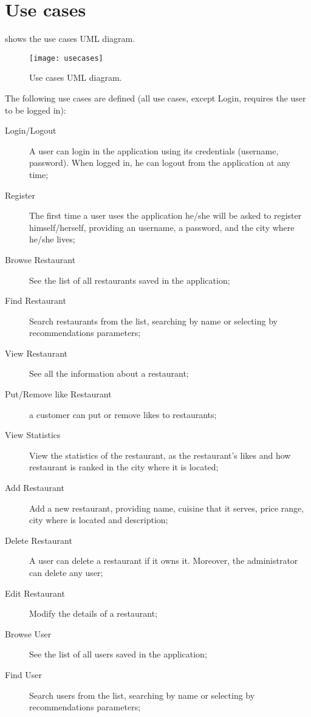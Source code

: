 \chapter{Use cases}\label{ch:usecases}

 shows the use cases UML diagram.

\begin{figure}[p]
	\texttt{[image: usecases]}
	\caption{Use cases UML diagram.}\label{fig:usecases}
\end{figure}

The following use cases are defined (all use cases, except Login, requires
the user to be logged in):
\begin{description}
	\item[Login/Logout] A user can login in the application using its
		credentials (username, password). When logged in, he can logout
		from the application at any time;
	\item[Register] The first time a user uses the application he/she will
		be asked to register himself/herself, providing an username, a
		password, and the city where he/she lives;
	\item[Browse Restaurant] See the list of all restaurants saved in the
		application;
	\item[Find Restaurant] Search restaurants from the list, searching by
		name or selecting by recommendations parameters;
	\item[View Restaurant] See all the information about a restaurant;
	\item[Put/Remove like Restaurant] a customer can put or remove likes to
		restaurants;
	\item[View Statistics] View the statistics of the restaurant, as
		the  restaurant’s likes and how restaurant is ranked in the
		city where it is located;
	\item[Add Restaurant] Add a new restaurant, providing name,
		cuisine that it serves, price range, city where is located and
		description;
	\item[Delete Restaurant] A user can delete a restaurant if it owns it.
		Moreover, the administrator can delete any user;
	\item[Edit Restaurant] Modify the details of a restaurant;
	\item[Browse User] See the list of all users saved in the application;
	\item[Find User] Search users from the list, searching by name or
		selecting by recommendations parameters;

\end{description}
